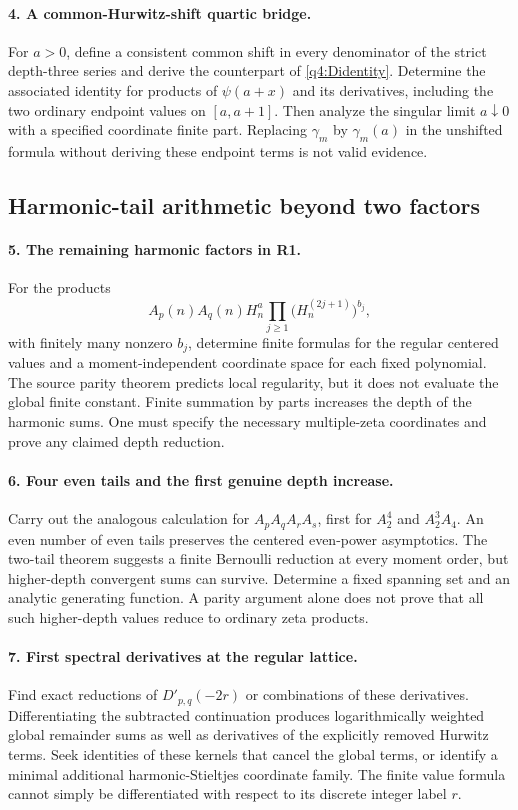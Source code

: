 \paragraph{4. A common-Hurwitz-shift quartic bridge.}
For $a>0$, define a consistent common shift in every denominator
of the strict depth-three series and derive the counterpart of
\eqref{q4:Didentity}. Determine the associated identity for
products of $\psi(a+x)$ and its derivatives, including the two
ordinary endpoint values on $[a,a+1]$. Then analyze the singular
limit $a\downarrow0$ with a specified coordinate finite part.
Replacing $\gamma_m$ by $\gamma_m(a)$ in the unshifted formula
without deriving these endpoint terms is not valid evidence.

\subsection{Harmonic-tail arithmetic beyond two factors}

\paragraph{5. The remaining harmonic factors in R1.}
For the products
\[
A_p(n)A_q(n)H_n^a
\prod_{j\ge1}\bigl(H_n^{(2j+1)}\bigr)^{b_j},
\]
with finitely many nonzero $b_j$, determine finite formulas for
the regular centered values and a moment-independent coordinate
space for each fixed polynomial. The source parity theorem predicts
local regularity, but it does not evaluate the global finite
constant. Finite summation by parts increases the depth of the
harmonic sums. One must specify the necessary multiple-zeta
coordinates and prove any claimed depth reduction.

\paragraph{6. Four even tails and the first genuine depth increase.}
Carry out the analogous calculation for
$A_pA_qA_rA_s$, first for $A_2^4$ and $A_2^3A_4$.
An even number of even tails preserves the centered even-power
asymptotics. The two-tail theorem suggests a finite Bernoulli
reduction at every moment order, but higher-depth convergent sums
can survive. Determine a fixed spanning set and an analytic
generating function. A parity argument alone does not prove that
all such higher-depth values reduce to ordinary zeta products.

\paragraph{7. First spectral derivatives at the regular lattice.}
Find exact reductions of $D'_{p,q}(-2r)$ or combinations of these
derivatives. Differentiating the subtracted continuation produces
logarithmically weighted global remainder sums as well as
derivatives of the explicitly removed Hurwitz terms. Seek
identities of these kernels that cancel the global terms, or
identify a minimal additional harmonic-Stieltjes coordinate
family. The finite value formula cannot simply be differentiated
with respect to its discrete integer label $r$.


